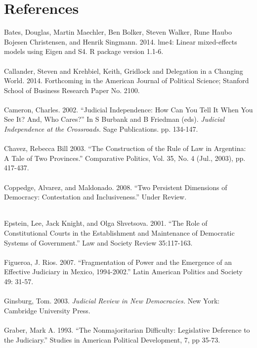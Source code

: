 \documentclass[12pt]{article}
\begin{document}
\section*{References}
\noindent Bates, Douglas, Martin Maechler, Ben Bolker, Steven Walker, Rune Haubo Bojesen Christensen, and Henrik Singmann. 2014. lme4: Linear mixed-effects models using Eigen and S4. R package version 1.1-6.\\

\\\noindent Callander, Steven and Krehbiel, Keith, Gridlock and Delegation in a Changing World. 2014. Forthcoming in the American Journal of Political Science; Stanford School of Business Research Paper No. 2100.\\

\\\noindent Cameron, Charles. 2002. ``Judicial Independence: How Can You Tell It When You See It? And, Who Cares?'' In S Burbank and B Friedman (eds). \textit{Judicial Independence
at the Crossroads.} Sage Publications. pp. 134-147.\\

\\\noindent Chavez, Rebecca Bill 2003. ``The Construction of the Rule of Law in Argentina: A Tale of Two Provinces.'' Comparative Politics, Vol. 35, No. 4 (Jul., 2003), pp. 417-437.\\

\\\noindent Coppedge, Alvarez, and Maldonado. 2008. ``Two Persistent Dimensions of Democracy: Contestation and Inclusiveness.'' Under Review.

\\\noindent Epstein, Lee, Jack Knight, and Olga Shvetsova. 2001. ``The Role of Constitutional Courts in the Establishment and Maintenance of Democratic Systems of Government.'' Law and Society Review 35:117-163.\\

\\\noindent Figueroa, J. Rios. 2007. ``Fragmentation of Power and the Emergence of an Effective Judiciary in Mexico, 1994-2002.'' Latin American Politics and Society 49: 31-57.\\

\\\noindent Ginsburg, Tom. 2003. \textit{Judicial Review in New Democracies.} New York: Cambridge University Press.\\

\\\noindent Graber, Mark A. 1993. ``The Nonmajoritarian Difficulty: Legislative Deference to the Judiciary.'' Studies in American Political Development, 7, pp 35-73.\\
\end{document}
